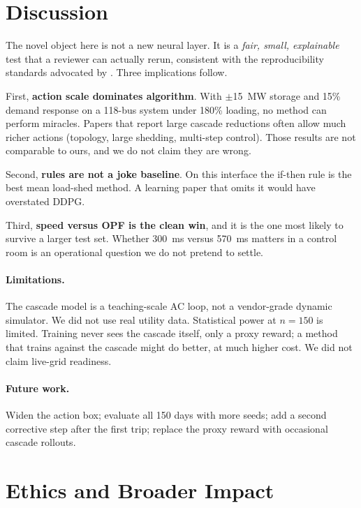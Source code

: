 \documentclass[11pt,a4paper]{article}
\begin{document}
\section{Discussion}

The novel object here is not a new neural layer.
It is a \emph{fair, small, explainable} test that a reviewer can actually rerun, consistent with the reproducibility standards advocated by \citet{pineau2021checklist}.
Three implications follow.

First, \textbf{action scale dominates algorithm}.
With $\pm$15~MW storage and 15\% demand response on a 118-bus system under 180\% loading, no method can perform miracles.
Papers that report large cascade reductions often allow much richer actions (topology, large shedding, multi-step control).
Those results are not comparable to ours, and we do not claim they are wrong.

Second, \textbf{rules are not a joke baseline}.
On this interface the if-then rule is the best mean load-shed method.
A learning paper that omits it would have overstated DDPG.

Third, \textbf{speed versus OPF is the clean win}, and it is the one most likely to survive a larger test set.
Whether 300~ms versus 570~ms matters in a control room is an operational question we do not pretend to settle.

\paragraph{Limitations.}
The cascade model is a teaching-scale AC loop, not a vendor-grade dynamic simulator.
We did not use real utility data.
Statistical power at $n=150$ is limited.
Training never sees the cascade itself, only a proxy reward; a method that trains against the cascade might do better, at much higher cost.
We did not claim live-grid readiness.

\paragraph{Future work.}
Widen the action box; evaluate all 150 days with more seeds; add a second corrective step after the first trip; replace the proxy reward with occasional cascade rollouts.

\section{Ethics and Broader Impact}
\end{document}
